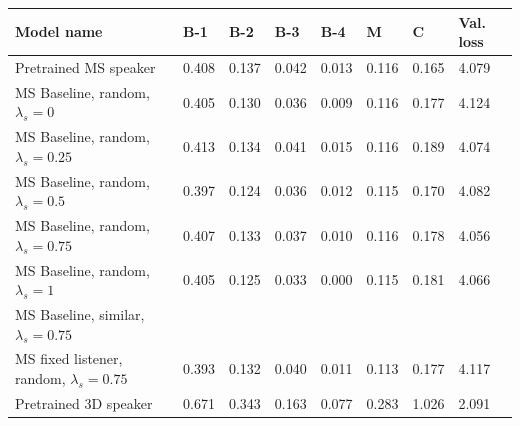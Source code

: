 \begin{table}[]
	\begin{tabularx}{\textwidth}{|X|l|l|l|l|l|l|l|}
		\hline
		\textbf{Model name}                                    & \textbf{B-1} & \textbf{B-2} & \textbf{B-3} & \textbf{B-4} & \textbf{M} & \textbf{C} & \textbf{Val. loss} \\ \hline
		Pretrained MS speaker                             & 0.408           & 0.137           & 0.042           & 0.013           & 0.116           & 0.165          & 4.079                    \\ \hline
		MS Baseline, random, $\lambda_s = 0$      &   0.405              &      0.130           &     0.036            &     0.009            &     0.116            &     0.177           &           4.124               \\ \hline
		MS Baseline, random, $\lambda_s = 0.25$   &          0.413       &       0.134          &      0.041          &       0.015          &       0.116          &       0.189        &           4.074               \\ \hline
		MS Baseline, random, $\lambda_s = 0.5$   &          0.397       &       0.124          &      0.036          &       0.012          &       0.115          &       0.170         &           4.082               \\ \hline
		MS Baseline, random, $\lambda_s = 0.75$   & 0.407           & 0.133           & 0.037           & 0.010           & 0.116           & 0.178          & 4.056                    \\ \hline
		MS Baseline, random, $\lambda_s = 1$   &    0.405             &   0.125              &    0.033             &  0.000              &         0.115        &       0.181         &         4.066                 \\ \hline
		MS Baseline, similar, $\lambda_s = 0.75$  &                 &                 &                 &                 &                 &                &                          \\ \hline
		MS fixed listener, random, $\lambda_s = 0.75$  &        0.393         &       0.132          &        0.040         &      0.011           &      0.113           &        0.177        &       4.117                   \\ \hline
		Pretrained 3D speaker                            & 0.671           & 0.343           & 0.163           & 0.077           & 0.283           & 1.026          & 2.091                    \\ \hline

\end{tabularx}
\end{table}
